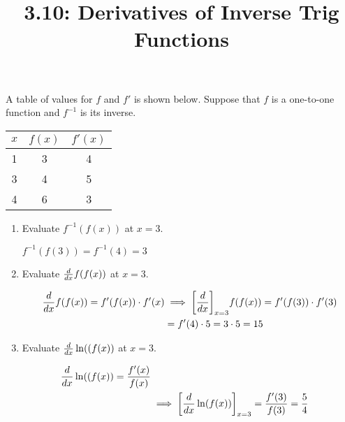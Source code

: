 \documentclass[nooutcomes]{ximera}
\title{3.10: Derivatives of Inverse Trig Functions}
\begin{document}
\begin{abstract}		\end{abstract}
\maketitle


\begin{problem}
  A table of values for $f$ and $f'$ is shown below.
  Suppose that $f$ is a one-to-one function and $f^{-1}$ is its inverse.
  \begin{center}
    \begin{tabular}{ccc}
\hline
      $x$ & $f(x)$ & $f'(x)$\\
\hline \hline
      1 & 3 & 4\\

      3 & 4 & 5\\

      4 & 6 & 3\\
\hline
    \end{tabular}
  \end{center}

  \begin{enumerate}
    \item Evaluate $f^{-1}(f(x))$ at $x = 3$.
      \begin{freeResponse}
         $ f^{-1}(f(3)) = f^{-1}(4) = 3$
      \end{freeResponse}


    \item Evaluate $\frac{d}{dx} f(f(x))$ at $x = 3$.
      \begin{freeResponse}

        \begin{align*}
          \frac{d}{dx} f(f(x)) = f'(f(x)) \cdot f'(x) &\implies \bigg[ \frac{d}{dx} \bigg]_{x = 3} f(f(x)) = f'(f(3)) \cdot f'(3)\\
          &= f'(4) \cdot 5 = 3 \cdot 5 = 15
        \end{align*}
      \end{freeResponse}


    \item Evaluate $\frac{d}{dx}\ln((f(x))$ at $x = 3$.
      \begin{freeResponse}

        \begin{align*}
          \frac{d}{dx}\ln((f(x)) = \frac{f'(x)}{f(x)} \\
          &\implies \bigg[ \frac{d}{dx} \ln(f(x)) \bigg]_{x = 3} = \frac{f'(3)}{f(3)} = \frac{5}{4}
        \end{align*}
      \end{freeResponse}



\end{enumerate}
\end{problem}
\end{document}
